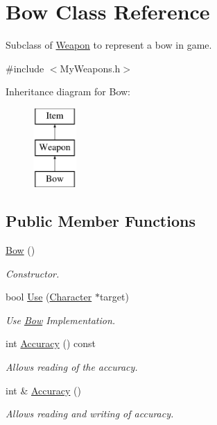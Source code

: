 \hypertarget{classBow}{\section{Bow Class Reference}
\label{classBow}
}


Subclass of \hyperlink{classWeapon}{Weapon} to represent a bow in game.  




{\ttfamily \#include $<$My\-Weapons.\-h$>$}

Inheritance diagram for Bow\-:\begin{figure}[H]
\begin{center}
\leavevmode
\includegraphics[height=3.000000cm]{classBow}
\end{center}
\end{figure}
\subsection*{Public Member Functions}
\begin{DoxyCompactItemize}
\item 
\hyperlink{classBow_ae13f3721e07f62cacca7dc87e7cd3e09}{Bow} ()
\begin{DoxyCompactList}\small\item\em Constructor. \end{DoxyCompactList}\item 
bool \hyperlink{classBow_a07d98049b83e0f21ccbef29c7294bde7}{Use} (\hyperlink{classCharacter}{Character} $\ast$target)
\begin{DoxyCompactList}\small\item\em Use \hyperlink{classBow}{Bow} Implementation. \end{DoxyCompactList}\item 
int \hyperlink{classBow_a21dbb0783c1679385328d55b441c929d}{Accuracy} () const 
\begin{DoxyCompactList}\small\item\em Allows reading of the accuracy. \end{DoxyCompactList}\item 
int \& \hyperlink{classBow_a52c352696cee03880097e8b28811e204}{Accuracy} ()
\begin{DoxyCompactList}\small\item\em Allows reading and writing of accuracy. \end{DoxyCompactList}\end{DoxyCompactItemize}

